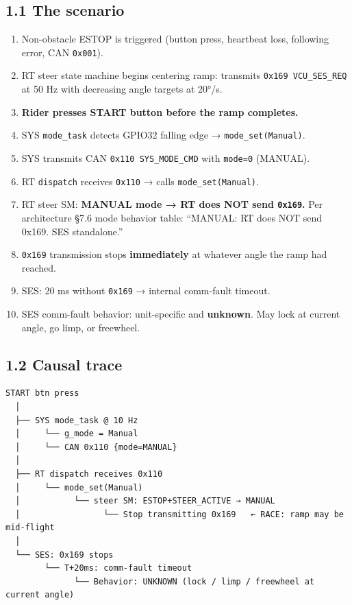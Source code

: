 \documentclass[12pt,a4paper,oneside]{report}
\providecommand{\tightlist}{\setlength{\itemsep}{0pt}\setlength{\parskip}{0pt}}
\begin{document}
\subsection{1.1 The scenario}\label{the-scenario}

\begin{enumerate}
\def\labelenumi{\arabic{enumi}.}
\tightlist
\item
  Non-obstacle ESTOP is triggered (button press, heartbeat loss, following
  error, CAN \texttt{0x001}).
\item
  RT steer state machine begins centering ramp: transmits
  \texttt{0x169\ VCU\_SES\_REQ} at 50 Hz with decreasing angle targets at 20°/s.
\item
  \textbf{Rider presses START button before the ramp completes.}
\item
  SYS \texttt{mode\_task} detects GPIO32 falling edge →
  \texttt{mode\_set(Manual)}.
\item
  SYS transmits CAN \texttt{0x110\ SYS\_MODE\_CMD} with \texttt{mode=0}
  (MANUAL).
\item
  RT \texttt{dispatch} receives \texttt{0x110} → calls
  \texttt{mode\_set(Manual)}.
\item
  RT steer SM: \textbf{MANUAL mode → RT does NOT send \texttt{0x169}.} Per
  architecture §7.6 mode behavior table: ``MANUAL: RT does NOT send 0x169. SES
  standalone.''
\item
  \texttt{0x169} transmission stops \textbf{immediately} at whatever angle the
  ramp had reached.
\item
  SES: 20 ms without \texttt{0x169} → internal comm-fault timeout.
\item
  SES comm-fault behavior: unit-specific and \textbf{unknown}. May lock at
  current angle, go limp, or freewheel.
\end{enumerate}

\subsection{1.2 Causal trace}\label{causal-trace}

\begin{verbatim}
START btn press
  │
  ├── SYS mode_task @ 10 Hz
  │     └── g_mode = Manual
  │     └── CAN 0x110 {mode=MANUAL}
  │
  ├── RT dispatch receives 0x110
  │     └── mode_set(Manual)
  │           └── steer SM: ESTOP+STEER_ACTIVE → MANUAL
  │                 └── Stop transmitting 0x169   ← RACE: ramp may be mid-flight
  │
  └── SES: 0x169 stops
        └── T+20ms: comm-fault timeout
              └── Behavior: UNKNOWN (lock / limp / freewheel at current angle)
\end{verbatim}
\end{document}
